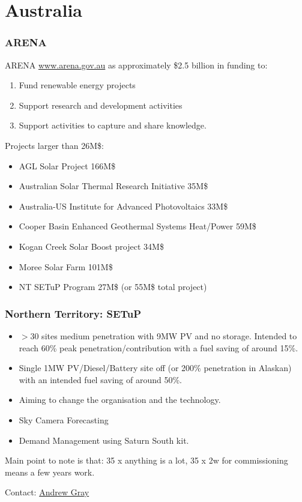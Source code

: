 \documentclass{beamer}
\begin{document}
\section{Australia}
\begin{frame}\frametitle{ARENA}
  ARENA \href{www.arena.gov.au}{www.arena.gov.au} as approximately \$2.5 billion in funding to:
  \begin{enumerate}
  \item Fund renewable energy projects
  \item Support research and development activities
  \item Support activities to capture and share knowledge.
  \end{enumerate}
\pause
Projects larger than 26M\$:
\begin{itemize}
\item AGL Solar Project 166M\$
\item Australian Solar Thermal Research Initiative 35M\$
\item Australia-US Institute for Advanced Photovoltaics 33M\$
\item Cooper Basin Enhanced Geothermal Systems Heat/Power 59M\$
\item Kogan Creek Solar Boost project 34M\$
\item Moree Solar Farm 101M\$
\item NT SETuP Program 27M\$ (or 55M\$ total project)
\end{itemize}
\end{frame}

\begin{frame}\frametitle{Northern Territory: SETuP} 
  \begin{itemize}
  \item $>$30 sites medium penetration with 9MW PV and no storage.
    \pause
    Intended to reach 60\% peak penetration/contribution with a fuel
    saving of around 15\%.
  \item Single 1MW PV/Diesel/Battery site off (or 200\%
    penetration in Alaskan) with an intended fuel saving of around 50\%.
  \item Aiming to change the organisation and the technology.
  \end{itemize}
  \pause
  \begin{itemize}
  \item Sky Camera Forecasting
  \item Demand Management using Saturn South kit.
  \end{itemize}
  \pause
  Main point to note is that: 35 x anything is a lot, 35 x 2w for
  commissioning means a few years work.

  Contact: \href{mailto:andrew.gray@powerwater.com.au}{Andrew Gray}
\end{frame}
\end{document}
